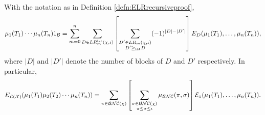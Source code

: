 		\begin{lemma}
			\label{lem:actingonFreeproductspace}
			With the notation as in Definition \ref{defn:ELRrecursiveproof},
			\[
				\mu_1(T_1) \cdots \mu_n(T_n)1_{\mathcal{B}} = \sum_{m=0}^n \sum_{D \in LR^{\operatorname{lat}}_m(\chi, \iota)} \left[ \sum_{\substack{ D' \in LR_m(\chi, \iota) \\ D' \geq_{\mathrm{lat}} D}} (-1)^{|D| - |D'|}
				\right] E_{D}(\mu_1(T_1),\ldots, \mu_n(T_n)),
			\]
			where $|D|$ and $|D'|$ denote the number of blocks of $D$ and $D'$ respectively.
			In particular,
			\[
				E_{\mathcal{L}(\mathcal{X})}(\mu_1(T_1) \mu_2(T_2) \cdots \mu_n(T_n)) = \sum_{\pi \in \mathcal{BNC}(\chi)} \left[ \sum_{\substack{\sigma\in \mathcal{BNC}(\chi)\\\pi\leq\sigma\leq\iota}}\mu_{\mathcal{BNC}}(\pi, \sigma) \right] \mathcal{E}_{\pi}(\mu_1(T_1),\ldots, \mu_n(T_n)).
			\]
		\end{lemma}





